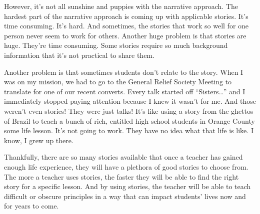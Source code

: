\documentclass[12pt]{article}
\begin{document}
However, it's not all sunshine and puppies with the narrative approach. The hardest part of the narrative approach is coming up with applicable stories. It's time consuming. It's hard. And sometimes, the stories that work so well for one person never seem to work for others. Another huge problem is that stories are huge. They're time consuming. Some stories require so much background information that it's not practical to share them.

Another problem is that sometimes students don't relate to the story. When I was on my mission, we had to go to the General Relief Society Meeting to translate for one of our recent converts. Every talk started off ``Sisters\dots'' and I immediately stopped paying attention because I knew it wasn't for me. And those weren't even stories! They were just talks! It's like using a story from the ghettos of Brazil to teach a bunch of rich, entitled high school students in Orange County some life lesson. It's not going to work. They have no idea what that life is like. I know, I grew up there.

Thankfully, there are so many stories available that once a teacher has gained enough life experience, they will have a plethora of good stories to choose from. The more a teacher uses stories, the faster they will be able to find the right story for a specific lesson. And by using stories, the teacher will be able to teach difficult or obscure principles in a way that can impact students' lives now and for years to come.
\end{document}
